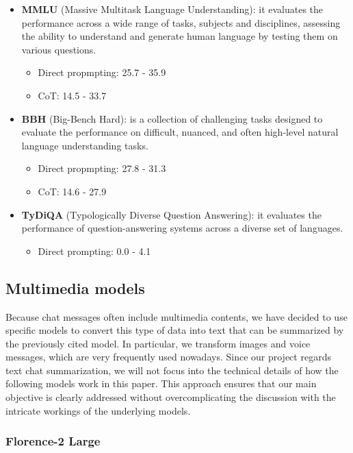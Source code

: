 \documentclass[10pt,twocolumn,letterpaper]{article}
\begin{document}
\begin{itemize}
    \item \textbf{MMLU} (Massive Multitask Language Understanding): it evaluates the performance across a wide range of tasks, subjects and disciplines, assessing the ability to understand and generate human language by testing them on various questions.
    \begin{itemize}
        \item Direct propmpting: 25.7 - 35.9
        \item CoT: 14.5 - 33.7
    \end{itemize}
    \item \textbf{BBH} (Big-Bench Hard): is a collection of challenging tasks designed to evaluate the performance on difficult, nuanced, and often high-level natural language understanding tasks. 
    \begin{itemize}
        \item Direct propmpting: 27.8 - 31.3
        \item CoT: 14.6 - 27.9
    \end{itemize}
    \item \textbf{TyDiQA} (Typologically Diverse Question Answering): it evaluates the performance of question-answering systems across a diverse set of languages.
    \begin{itemize}
        \item Direct prompting: 0.0 - 4.1
    \end{itemize}
\end{itemize}

\subsection{Multimedia models}

Because chat messages often include multimedia contents, we have decided to use specific models to convert this type of data into text that can be summarized by the previously cited model. In particular, we transform images and voice messages, which are very frequently used nowadays. 
Since our project regards text chat summarization, we will not focus into the technical details of how the following models work in this paper. This approach ensures that our main objective is clearly addressed without overcomplicating the discussion with the intricate workings of the underlying models.

\subsubsection{Florence-2 Large}
\end{document}

